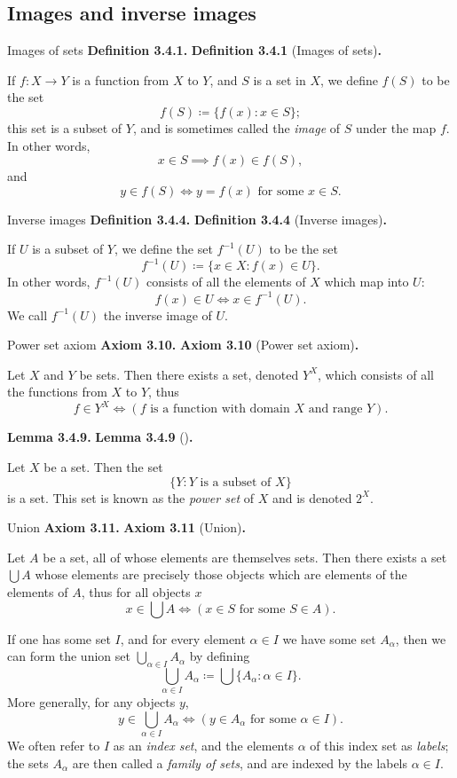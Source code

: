 \documentclass[12pt]{article}
\newenvironment{df}[2][\relax]{
\vspace{4mm}
    \noindent\setlength{\parskip}{1em}%
    \ifx#1\relax%
        \textbf{#2. }%
    \else%
        \textbf{#2} (#1)\textbf{. }%
    \fi%
    \ignorespaces%
}{}
\theoremstyle{remark}
\begin{document}
\subsection{Images and inverse images}
\begin{df}[Images of sets]{Definition 3.4.1}
    If $f : X \to Y$ is a function from $X$ to $Y$, and $S$ is a set in $X$, we define $f(S)$ to be the set
    \[
        f(S) \coloneqq \{ f(x): x \in S \};
    \]
    this set is a subset of $Y$, and is sometimes called the \emph{image} of $S$ under the map $f$.
    In other words,
    \[
        x \in S \implies f(x) \in f(S),
    \]
    and
    \[
        y \in f(S) \iff y = f(x) \text{ for some } x \in S.
    \]
\end{df}


\begin{df}[Inverse images]{Definition 3.4.4}
     If $U$ is a subset of $Y$, we define the set $f^{-1}(U)$ to be the set
     \[
        f^{-1}(U) \coloneqq \{ x \in X : f(x) \in U \}.
    \]
    In other words, $f^{-1}(U)$ consists of all the elements of $X$ which map into $U$:
    \[
        f(x) \in U \iff x \in f^{-1}(U).
    \]
    We call $f^{-1}(U)$ the inverse image of $U$.
\end{df}


\begin{df}[Power set axiom]{Axiom 3.10}
     Let $X$ and $Y$ be sets.
     Then there exists a set, denoted $Y^X$, which consists of all the functions from $X$ to $Y$, thus
     \[
        f \in Y^X \iff (f \text{ is a function with domain } X \text{ and range } Y).
    \]
\end{df}


\begin{df}{Lemma 3.4.9}
    Let $X$ be a set. Then the set
    \[
        \{ Y : Y \text{ is a subset of } X \}
    \]
    is a set.
    This set is known as the \emph{power set} of $X$ and is denoted $2^X$.
\end{df}


\begin{df}[Union]{Axiom 3.11}
    Let $A$ be a set, all of whose elements are themselves sets.
    Then there exists a set $\bigcup A$ whose elements are precisely those objects which are elements of the elements of $A$, thus for all objects $x$
    \[
        x \in \bigcup A \iff (x \in S \text{ for some } S \in A). 
    \]

     If one has some set $I$, and for every element $\alpha \in I$ we have some set $A_\alpha$, then we can form the union set $\bigcup _{\alpha \in I} A_\alpha$ by defining
     \[
        \bigcup_{\alpha \in I} A_\alpha \coloneqq \bigcup \{ A_\alpha : \alpha \in I \}.
     \]
     More generally, for any objects $y$,
     \[
        y \in \bigcup_{\alpha \in I} A_\alpha \iff (y \in A_\alpha \text{ for some } \alpha \in I). \tag{3.2}\label{eq:3.2}
     \]
     We often refer to $I$ as an \emph{index set}, and the elements $\alpha$ of this index set as \emph{labels}; the sets $A_\alpha$ are then called a \emph{family of sets}, and are indexed by the labels $\alpha \in I$.
\end{df}
\end{document}
